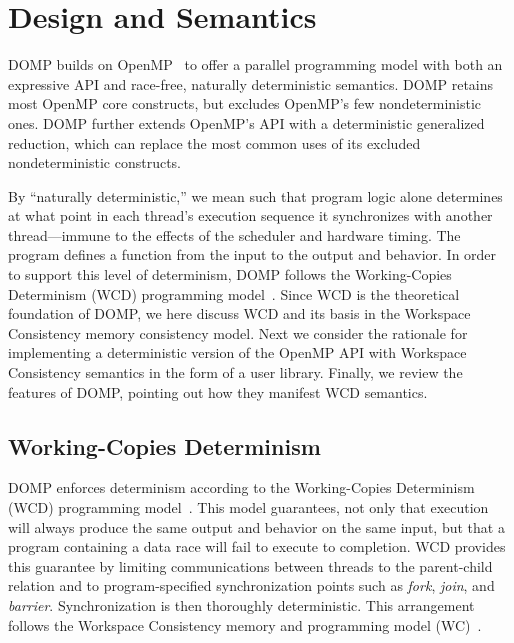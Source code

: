 %
%
\chapter{Design and Semantics}
\label{chap:domp}
DOMP builds on OpenMP~\cite{openmp08} to offer a parallel programming model with both an expressive API and race-free, naturally deterministic semantics.  DOMP retains most OpenMP core constructs, but excludes OpenMP's few nondeterministic ones.  DOMP further extends OpenMP's API with a deterministic generalized reduction, which can replace the most common uses of its excluded nondeterministic constructs.

By ``naturally deterministic,'' we mean such that program logic alone determines at what point in each thread's execution sequence it synchronizes with another thread---immune to the effects of the scheduler and hardware timing.  The program defines a function from the input to the output and behavior.  In order to support this level of determinism, DOMP follows the Working-Copies Determinism (WCD) programming model~\cite{aviram11workspace}.  Since WCD is the theoretical foundation of DOMP, we here discuss WCD and its basis in the Workspace Consistency memory consistency model.  Next we consider the rationale for implementing a deterministic version of the OpenMP API with Workspace Consistency semantics in the form of a user library.  Finally, we review the features of DOMP, pointing out how they manifest WCD semantics.
%
\section{Working-Copies Determinism}
\label{sec:domp-wcd}
%
DOMP enforces determinism according to the Working-Copies Determinism (WCD) programming model~\cite{aviram11workspace}.  This model guarantees, not only that execution will always produce the same output and behavior on the same input, but that a program containing a data race will fail to execute to completion.  WCD provides this guarantee by limiting communications between threads to the parent-child relation and to program-specified synchronization points such as \textit{fork}, \textit{join}, and \textit{barrier}.  Synchronization is then thoroughly deterministic.  This arrangement follows the Workspace Consistency memory and programming model (WC)~\cite{aviram11workspace}.


